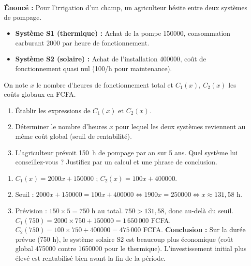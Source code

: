\documentclass[11pt]{article}
\begin{document}
\begin{exercice}
\textbf{Énoncé :} Pour l'irrigation d'un champ, un agriculteur hésite entre deux systèmes de pompage.
\begin{itemize}
    \item \textbf{Système S1 (thermique) :} Achat de la pompe \SI{150000}{}, consommation carburant \SI{2000}{} par heure de fonctionnement.
    \item \textbf{Système S2 (solaire) :} Achat de l'installation \SI{400000}{}, coût de fonctionnement quasi nul (\SI{100}{}/h pour maintenance).
\end{itemize}
On note $x$ le nombre d'heures de fonctionnement total et $C_1(x)$, $C_2(x)$ les coûts globaux en FCFA.
\begin{enumerate}
    \item Établir les expressions de $C_1(x)$ et $C_2(x)$.
    \item Déterminer le nombre d'heures $x$ pour lequel les deux systèmes reviennent au même coût global (seuil de rentabilité).
    \item L'agriculteur prévoit \SI{150}{h} de pompage par an sur 5 ans. Quel système lui conseillez-vous ? Justifiez par un calcul et une phrase de conclusion.
\end{enumerate}
\end{exercice}

\begin{corrige}
\begin{enumerate}
    \item $C_1(x) = 2000x + 150000$ \quad ; \quad $C_2(x) = 100x + 400000$.
    \item Seuil : $2000x + 150000 = 100x + 400000 \iff 1900x = 250000 \iff x \approx 131,58$ h.
    \item Prévision : $150 \times 5 = 750$ h au total. $750 > 131,58$, donc au-delà du seuil.
    $C_1(750) = 2000 \times 750 + 150000 = 1\,650\,000$ FCFA.
    $C_2(750) = 100 \times 750 + 400000 = 475\,000$ FCFA.
    \textbf{Conclusion :} Sur la durée prévue (750 h), le système solaire S2 est beaucoup plus économique (coût global \SI{475000}{} contre \SI{1650000}{} pour le thermique). L'investissement initial plus élevé est rentabilisé bien avant la fin de la période.
\end{enumerate}
\end{corrige}

\newpage
\end{document}
